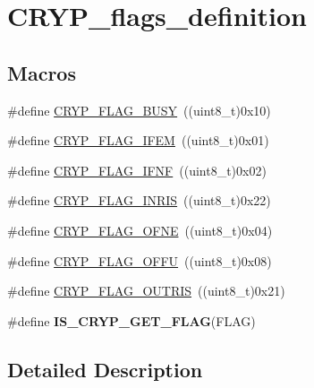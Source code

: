 \hypertarget{group___c_r_y_p__flags__definition}{\section{C\-R\-Y\-P\-\_\-flags\-\_\-definition}
\label{group___c_r_y_p__flags__definition}
}
\subsection*{Macros}
\begin{DoxyCompactItemize}
\item 
\#define \hyperlink{group___c_r_y_p__flags__definition_ga701f57afbf29f56f57eadc76835008ce}{C\-R\-Y\-P\-\_\-\-F\-L\-A\-G\-\_\-\-B\-U\-S\-Y}~((uint8\-\_\-t)0x10)
\item 
\#define \hyperlink{group___c_r_y_p__flags__definition_gac595f461b1eae355a5f22c6ddbb6b795}{C\-R\-Y\-P\-\_\-\-F\-L\-A\-G\-\_\-\-I\-F\-E\-M}~((uint8\-\_\-t)0x01)
\item 
\#define \hyperlink{group___c_r_y_p__flags__definition_ga0c5c1eb9236f373c522cbc407b18b7dd}{C\-R\-Y\-P\-\_\-\-F\-L\-A\-G\-\_\-\-I\-F\-N\-F}~((uint8\-\_\-t)0x02)
\item 
\#define \hyperlink{group___c_r_y_p__flags__definition_gae78eb0d13fa041688f4b33479b632232}{C\-R\-Y\-P\-\_\-\-F\-L\-A\-G\-\_\-\-I\-N\-R\-I\-S}~((uint8\-\_\-t)0x22)
\item 
\#define \hyperlink{group___c_r_y_p__flags__definition_gaa0810704152c5810a2461acdec0cf13d}{C\-R\-Y\-P\-\_\-\-F\-L\-A\-G\-\_\-\-O\-F\-N\-E}~((uint8\-\_\-t)0x04)
\item 
\#define \hyperlink{group___c_r_y_p__flags__definition_ga6dd1f9ebfe8658ade0855f34607e0a6b}{C\-R\-Y\-P\-\_\-\-F\-L\-A\-G\-\_\-\-O\-F\-F\-U}~((uint8\-\_\-t)0x08)
\item 
\#define \hyperlink{group___c_r_y_p__flags__definition_gae6f06dee9a989cfc664be879fed2ded2}{C\-R\-Y\-P\-\_\-\-F\-L\-A\-G\-\_\-\-O\-U\-T\-R\-I\-S}~((uint8\-\_\-t)0x21)
\item 
\#define {\bfseries I\-S\-\_\-\-C\-R\-Y\-P\-\_\-\-G\-E\-T\-\_\-\-F\-L\-A\-G}(F\-L\-A\-G)
\end{DoxyCompactItemize}


\subsection{Detailed Description}


